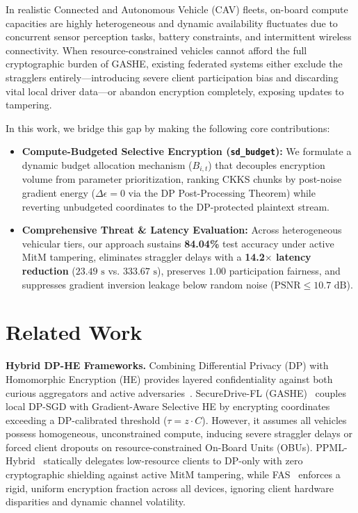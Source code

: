 \documentclass[acmtog,nonacm]{acmart}
\begin{document}
In realistic Connected and Autonomous Vehicle (CAV) fleets, on-board compute capacities are highly heterogeneous and dynamic availability fluctuates due to concurrent sensor perception tasks, battery constraints, and intermittent wireless connectivity. When resource-constrained vehicles cannot afford the full cryptographic burden of GASHE, existing federated systems either exclude the stragglers entirely---introducing severe client participation bias and discarding vital local driver data---or abandon encryption completely, exposing updates to tampering.

In this work, we bridge this gap by making the following core contributions:
\begin{itemize}
    \item \textbf{Compute-Budgeted Selective Encryption (\texttt{sd\_budget}):} We formulate a dynamic budget allocation mechanism ($B_{i,t}$) that decouples encryption volume from parameter prioritization, ranking CKKS chunks by post-noise gradient energy ($\Delta\epsilon = 0$ via the DP Post-Processing Theorem) while reverting unbudgeted coordinates to the DP-protected plaintext stream.
    \item \textbf{Comprehensive Threat \& Latency Evaluation:} Across heterogeneous vehicular tiers, our approach sustains \textbf{84.04\%} test accuracy under active MitM tampering, eliminates straggler delays with a \textbf{14.2$\times$ latency reduction} ($23.49\text{ s}$ vs. $333.67\text{ s}$), preserves $1.00$ participation fairness, and suppresses gradient inversion leakage below random noise ($\text{PSNR} \le 10.7\text{ dB}$).
\end{itemize}

\section{Related Work}
\label{sec:related_work}

\textbf{Hybrid DP-HE Frameworks.}
Combining Differential Privacy (DP) with Homomorphic Encryption (HE) provides layered confidentiality against both curious aggregators and active adversaries~\cite{gul2026securedrive,negoya2025ppml,korkmaz2025fas}. SecureDrive-FL (GASHE)~\cite{gul2026securedrive} couples local DP-SGD with Gradient-Aware Selective HE by encrypting coordinates exceeding a DP-calibrated threshold ($\tau = z \cdot C$). However, it assumes all vehicles possess homogeneous, unconstrained compute, inducing severe straggler delays or forced client dropouts on resource-constrained On-Board Units (OBUs). PPML-Hybrid~\cite{negoya2025ppml} statically delegates low-resource clients to DP-only with zero cryptographic shielding against active MitM tampering, while FAS~\cite{korkmaz2025fas} enforces a rigid, uniform encryption fraction across all devices, ignoring client hardware disparities and dynamic channel volatility.
\end{document}
